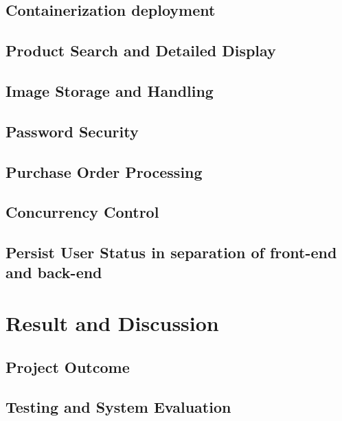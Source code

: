 \documentclass{article}
\begin{document}
\subsection{Containerization deployment}

\subsection{Product Search and Detailed Display}

\subsection{Image Storage and Handling}

\subsection{Password Security}

\subsection{Purchase Order Processing}

\subsection{Concurrency Control}

\subsection{Persist User Status in separation of front-end and back-end}

\section{Result and Discussion}

\subsection{Project Outcome}

\subsection{Testing and System Evaluation}
\end{document}
